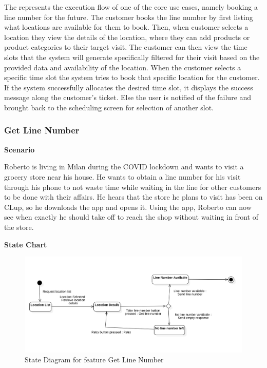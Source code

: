 The  represents the execution flow of one of the core use cases, namely booking a line number for the future.
The customer books the line number by first listing what locations are available for them to book.
Then, when customer selects a location they view the details of the location, where they can add products or product categories to their target visit.
The customer can then view the time slots that the system will generate specifically filtered for their visit based on the provided data and availability of the location.
When the customer selects a specific time slot the system tries to book that specific location for the customer.
If the system successfully allocates the desired time slot, it displays the success message along the customer's ticket.
Else the user is notified of the failure and brought back to the scheduling screen for selection of another slot.


\subsubsection{Get Line Number}

\textbf{Scenario}

Roberto is living in Milan during the COVID lockdown and wants to visit a grocery store near his house.
He wants to obtain a line number for his visit through his phone to not waste time while waiting in the line for other customers to be done with their affairs.
He hears that the store he plans to visit has been on CLup, so he downloads the app and opens it.
Using the app, Roberto can now see when exactly he should take off to reach the shop without waiting in front of the store.

\textbf{State Chart}

\begin{figure}[H]
    \centering
    \includegraphics[height=0.4\textwidth]{Images/StateCharts/GenerateLineNumber.png}
    \caption{State Diagram for feature Get Line Number}
    \label{fig:SDGetLine}
\end{figure}

